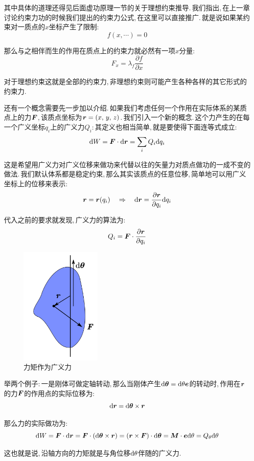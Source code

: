其中具体的道理还得见后面虚功原理一节的关于理想约束推导.\,我们指出,\,在上一章讨论约束力功的时候我们提出的约束力公式,\,在这里可以直接推广.\,就是说如果某约束对一质点的$x$坐标产生了限制:
\[f(x,\cdots)=0\]

那么与之相伴而生的作用在质点上的约束力就必然有一项$x$分量:
\[F_x=\lambda_f\frac{\partial f}{\partial x}\]

对于理想约束这就是全部的约束力,\,非理想约束则可能产生各种各样的其它形式的约束力.

还有一个概念需要先一步加以介绍.\,如果我们考虑任何一个作用在实际体系的某质点上的力$\boldsymbol{F}$,\,该质点坐标为$\boldsymbol{r}=(x,\,y,\,z)$.\,我们引入一个新的概念.\,这个力产生的在每一个广义坐标$q_i$上的广义力$Q_i$:\,其定义也相当简单,\,就是要使得下面连等式成立:
\[\textrm{d} W=\boldsymbol{F}\cdot \textrm{d} \boldsymbol{r}=\sum_i Q_i\textrm{d} q_i\]

这是希望用广义力对广义位移来做功来代替以往的矢量力对质点做功的一成不变的做法.\,我们默认体系都是稳定约束,\,那么其实该质点的任意位移,\,简单地可以用广义坐标上的位移来表示:
\[\boldsymbol{r}=\boldsymbol{r}(q_i)\quad \Rightarrow \quad \textrm{d} \boldsymbol{r}=\frac{\partial \boldsymbol{r}}{\partial q_i}\textrm{d} q_i\]

代入之前的要求就发现,\,广义力的算法为:
\[Q_i=\boldsymbol{F}\cdot\frac{\partial \boldsymbol{r}}{\partial q_i}\]

\begin{figure}
\centering
\includegraphics[width=4cm]{image/6-2-5.png}
\caption{力矩作为广义力}
\end{figure}
举两个例子:\,一是刚体可做定轴转动,\,那么当刚体产生$\textrm{d} \boldsymbol{\theta}=\textrm{d} \theta \boldsymbol{e}$的转动时,\,作用在$\boldsymbol{r}$的力$\boldsymbol{F}$的作用点的实际位移为:
\[\textrm{d} \boldsymbol{r}=\textrm{d} \boldsymbol{\theta}\times \boldsymbol{r}\]

那么力的实际做功为:
\[\textrm{d} W=\boldsymbol{F}\cdot \textrm{d} \boldsymbol{r}=\boldsymbol{F}\cdot(\textrm{d} \boldsymbol{\theta}\times \boldsymbol{r})=(\boldsymbol{r}\times\boldsymbol{F})\cdot\textrm{d} \boldsymbol{\theta}=\boldsymbol{M}\cdot \boldsymbol{e}\textrm{d} \theta =Q_\theta \textrm{d} \theta\]

这也就是说,\,沿轴方向的力矩就是与角位移$\textrm{d} \theta$伴随的广义力.

